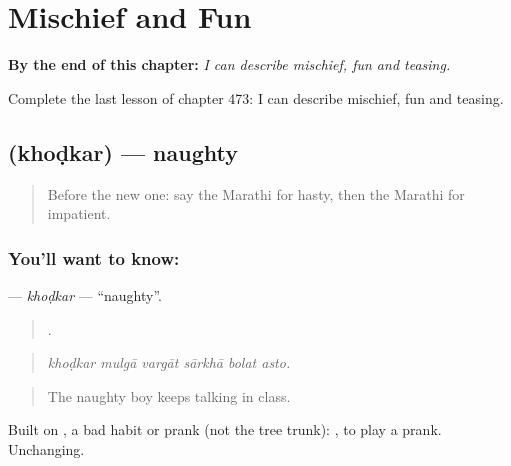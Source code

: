 
\chapter{Mischief and Fun}
\label{ch:mr-mischief-and-fun}

\begin{chapteropening}
\textbf{By the end of this chapter:} \emph{I can describe mischief, fun and teasing.}

Complete the last lesson of chapter 473: I can describe mischief, fun and teasing.
\end{chapteropening}

\section[\texorpdfstring{\mr{खोडकर} (khoḍkar)}{खोडकर (khoḍkar)}]{ (khoḍkar) — naughty}

\label{lesson:MR-C473-khodkar}



\begin{quote}
Before the new one: say the Marathi for hasty, then the Marathi for impatient.
\end{quote}

\subsection*{You'll want to know: }
\textbf{} — \emph{khoḍkar} — \textquotedblleft{}naughty\textquotedblright{}.

\begin{quote}
     .
\end{quote}

\begin{quote}
\emph{khoḍkar mulgā vargāt sārkhā bolat asto.}
\end{quote}

\begin{quote}
The naughty boy keeps talking in class.
\end{quote}

Built on , a bad habit or prank (not the tree trunk):  , to play a prank. Unchanging.

